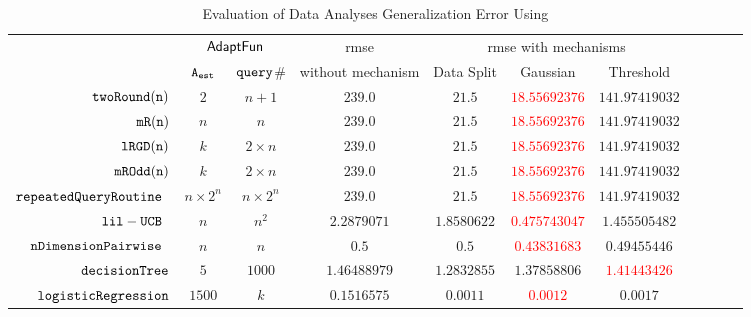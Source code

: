 {\footnotesize
\begin {table}[H]
        \vspace{-0.2cm}
        \caption{Evaluation of Data Analyses Generalization Error Using {\THESYSTEM}}
    \vspace{-0.2cm}
        \label{tb:adapt-imp}
        \begin{center}
        \centering
{\tiny
        \begin{tabular}{| >{\tiny}r | c | c | c | c | c | c | c | c | c | c  }
         \hline \hline
        \multirow{2}{*}{Program $c$}
         & \multicolumn{2}{c|}{$\textsf{AdaptFun}$}
         & {rmse}
         & \multicolumn{3}{c|}{rmse with mechanisms} \\ 
         \cline{2-3} \cline{5-7}
         & {${\mathtt{A_{est}}}$ } & {${\tt query}$\# } &  without mechanism & Data Split & Gaussian & Threshold  \\ 
         \cline{6-7}
         \hline \hline
         $  \mathtt{ twoRound(n) }$ & $ 2 $ & $  n + 1 $ & $239.0$   & $21.5$ & \textcolor{red}{$18.55692376$} & $141.97419032$  \\
         $  \mathtt{ mR(n) }$ & $ n $ & $  n  $ & $239.0$   & $21.5$ & \textcolor{red}{$18.55692376$} & $141.97419032$  \\
         $  \mathtt{ lRGD(n) }$ & $ k $ & $  2\times n $ & $239.0$   & $21.5$ & \textcolor{red}{$18.55692376$} & $141.97419032$  \\
         $  \mathtt{ mROdd(n) }$ & $ k $ & $  2 \times n $ & $239.0$   & $21.5$ & \textcolor{red}{$18.55692376$} & $141.97419032$  \\
         $  \mathtt{repeatedQueryRoutine}$~\cite{Jamieson2015TheAO} & $ n \times 2^n $ & $  n \times 2^n $ & $239.0$   & $21.5$ & \textcolor{red}{$18.55692376$} & $141.97419032$  \\
         $  \mathtt{lil-UCB}$~\cite{Jamieson2015TheAO} & $ n $ & $  n^2 $ & $ 2.2879071$   & $ 1.8580622$ & \textcolor{red}{$0.475743047$} & $ 1.455505482 $  \\
         $  \mathtt{nDimensionPairwise}$~\cite{Jamieson2015TheAO} & $ n $ & $  n  $ & $0.5$   & $0.5$ & \textcolor{red}{$ 0.43831683 $} & {$0.49455446$}  \\
         $  \mathtt{decisionTree}$ & $5$ &  $1000$ & $ 1.46488979 $  & $ 1.2832855 $ & $ 1.37858806 $ & \textcolor{red}{$1.41443426 $}  \\
         $  \mathtt{logisticRegression}$ & $1500$ &  $k$ & $ 0.1516575 $  &  $ 0.0011 $ & \textcolor{red}{$0.0012$} & {$0.0017$}   \\

\end{tabular}}
\end{center}
\end{table}}
